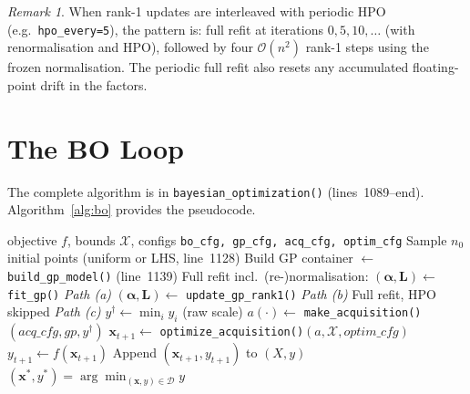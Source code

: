 \documentclass[11pt,a4paper]{article}
\newcommand{\bx}{\bm{x}}
\newcommand{\bL}{\bm{L}}
\newcommand{\balpha}{\bm{\alpha}}
\theoremstyle{remark}
\newtheorem{remark}{Remark}
\newcommand{\codeline}[1]{line~#1}
\newcommand{\coderange}[2]{lines~#1--#2}
\newcommand{\codefn}[1]{\texttt{#1()}}
\begin{document}
\begin{remark}
When rank-1 updates are interleaved with periodic HPO (e.g.\
\texttt{hpo\_every=5}), the pattern is: full refit at iterations
$0, 5, 10, \ldots$ (with renormalisation and HPO), followed by four
$\mathcal{O}(n^2)$ rank-1 steps using the frozen normalisation.  The periodic
full refit also resets any accumulated floating-point drift in the factors.
\end{remark}

\section{The BO Loop}
\label{sec:bo_loop}

The complete algorithm is in \codefn{bayesian\_optimization}
(\coderange{1089}{end}).  Algorithm~\ref{alg:bo} provides the pseudocode.

\begin{algorithm}[ht]
\caption{Bayesian Optimisation --- \codefn{bayesian\_optimization}}
\label{alg:bo}
\begin{algorithmic}[1]
\Require objective $f$, bounds $\mathcal{X}$, configs
  \texttt{bo\_cfg, gp\_cfg, acq\_cfg, optim\_cfg}
\State Sample $n_0$ initial points (uniform or LHS, \codeline{1128})
\State Build GP container $\leftarrow$ \codefn{build\_gp\_model} (\codeline{1139})
\For{$t = 0, 1, \ldots, T-1$}
    \State Full refit incl.\ (re-)normalisation: $(\balpha, \bL) \leftarrow$ \codefn{fit\_gp}
           \hfill \textit{Path (a)}
    \State $(\balpha, \bL) \leftarrow$ \codefn{update\_gp\_rank1}
           \hfill \textit{Path (b)}
  \Else
    \State Full refit, HPO skipped
           \hfill \textit{Path (c)}
  \EndIf
  \State $y^\dagger \leftarrow \min_i y_i$ \quad (raw scale)
  \State $a(\cdot) \leftarrow$ \codefn{make\_acquisition}$(acq\_cfg, gp, y^\dagger)$
  \State $\bx_{t+1} \leftarrow$ \codefn{optimize\_acquisition}$(a, \mathcal{X}, optim\_cfg)$
  \State $y_{t+1} \leftarrow f(\bx_{t+1})$
  \State Append $(\bx_{t+1}, y_{t+1})$ to $(X, y)$
\EndFor
\State \Return $(\bx^*, y^*) = \arg\min_{(\bx,y)\in\mathcal{D}} y$
\end{algorithmic}
\end{algorithm}

\end{document}

